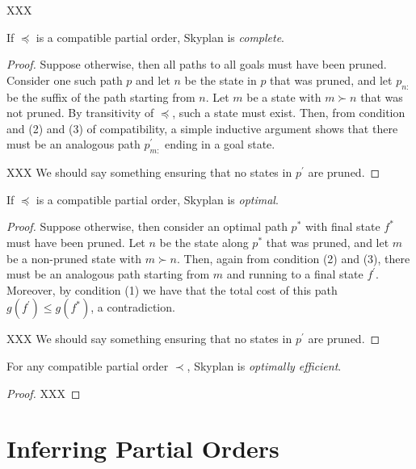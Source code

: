 \documentclass[letterpaper]{article}
\theoremstyle{plain} \newtheorem{theorem}{Theorem} \newtheorem{proposition}{Proposition} \newtheorem{lemma}{Lemma}
\theoremstyle{definition} \newtheorem{definition}{Definition} \newtheorem{conjecture}{Conjecture} \newtheorem*{example}{Example}
\theoremstyle{remark} \newtheorem*{remark}{Remark} \newtheorem*{note}{Note} \newtheorem{case}{Case}
\begin{document}
XXX

\begin{claim}{}\label{clm-complete}
   If $\preceq$ is a compatible partial order, Skyplan
is \emph{complete}.
\end{claim}
\begin{proof} Suppose otherwise, then all paths to all goals must
have been pruned. Consider one such path $p$ and let $n$ be the
state in $p$ that was pruned, and let $p_{n:}$ be the suffix of the
path starting from $n$. Let $m$ be a state with $m \succ n$ that was
not pruned.  By transitivity of $\preceq$, such a state must exist.
Then, from condition and (2) and (3) of compatibility, a simple
inductive argument shows that there must be an analogous path 
$p^\prime_{m:}$ ending in a goal state.

  XXX We should say something ensuring that no states in $p^\prime$ are pruned.
\end{proof}
  
\begin{claim}{}\label{clm-optimal}
   If $\preceq$ is a compatible partial order, Skyplan
is \emph{optimal}.
\end{claim}
\begin{proof} Suppose otherwise, then consider an optimal path $p^*$ with final state $f^*$
  must have been pruned. Let $n$ be the state along $p^*$ that
  was pruned, and let $m$ be a non-pruned state with $m \succ n$.
  Then, again from condition (2) and (3), there must be an analogous path
  starting from $m$ and running to a final state $f^\prime$. Moreover, by condition (1)
  we have that the total cost of this path $g(f^\prime) \le g(f^*)$, a contradiction.

  XXX We should say something ensuring that no states in $p^\prime$ are pruned.
\end{proof}



\begin{claim}{}\label{clm-optimally-efficient}
For any compatible partial order $\prec$, Skyplan is \emph{optimally efficient}.
\end{claim}
\begin{proof} XXX \end{proof}

\section{Inferring Partial Orders}

\newcommand{\po}{\preceq_R}
\end{document}
